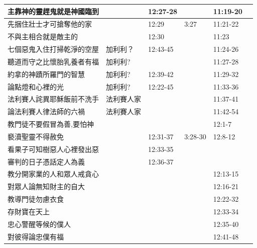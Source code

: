 \begin{table}[H]
\begin{tabular}{p{13.07em}|l|l|l|p{5.285em}|r}
主靠神的靈趕鬼就是神國臨到&\multicolumn{1}{l|}{}& 12:27-28&& 11:19-20& \\ \midrule

先捆住壯士才可搶奪他的家&\multicolumn{1}{l|}{}& 12:29& 3:27& 11:21-22& \\ \midrule

不與主相合就是敵主的&\multicolumn{1}{l|}{}& 12:30& & 11:23& \\ \midrule


七個惡鬼入住打掃乾淨的空屋&\multicolumn{1}{l|}{加利利？}&12:43-45 & & 11:24-26& \\ \midrule


聽道而守之比懷胎乳養者有福&\multicolumn{1}{l|}{加利利?}& &  & 11:27-28& \\ \midrule
約拿的神蹟所羅門的智慧&\multicolumn{1}{l|}{加利利?}& 12:39-42 &  & 11:29-32 & \\ \midrule
論點燈和心裡的光&\multicolumn{1}{l|}{加利利?}& 12:22-45 &  & 11:33-36 & \\ \midrule

法利賽人詫異耶穌飯前不洗手&法利賽人家 &       &       & 11:37-41&  \\ \midrule
論法利賽人律法師的六禍 &法利賽人家&       &       & 11:42-54 &  \\ \midrule

教門徒不要假冒為善,要怕神&       &       &       &12:1-7&  \\ \midrule
褻瀆聖靈不得赦免&       &    12:31-37 &3:28-30      &12:8-12&  \\ \midrule

看果子可知樹惡人心裡發出惡&       &    12:33-35 & &&  \\ \midrule
審判的日子憑話定人為義&       &    12:36-37 & &&  \\ \midrule

教分開家業的人和眾人戒貪心&       &       &       &12:13-15&  \\ \midrule
對眾人論無知財主的自大&       &       &       &12:16-21&  \\ \midrule
教導門徒勿慮衣食&       &       &       &12:22-32&  \\ \midrule
存財寶在天上&       &       &       &12:33-34&  \\ \midrule
忠心警醒等候的僕人&       &       &       &12:35-40&  \\ \midrule
對彼得論忠僕有福&       &       &       &12:41-48&  \\ \midrule


\end{tabular}
\end{table}
